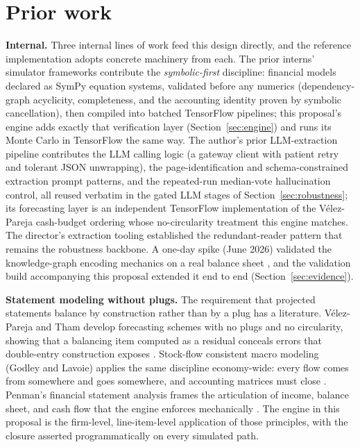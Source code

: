 \documentclass[11pt]{article}
\newcommand{\lead}[2]{\par\addvspace{5pt}\textbf{\textcolor{#1}{#2}}}
\begin{document}
\section{Prior work}
\label{sec:prior}
\lead{navytwo}{Internal.} Three internal lines of work feed this design directly, and the reference implementation adopts concrete machinery from each. The prior interns' simulator frameworks contribute the \emph{symbolic-first} discipline: financial models declared as SymPy equation systems, validated before any numerics (dependency-graph acyclicity, completeness, and the accounting identity proven by symbolic cancellation), then compiled into batched TensorFlow pipelines; this proposal's engine adds exactly that verification layer (Section~\ref{sec:engine}) and runs its Monte Carlo in TensorFlow the same way. The author's prior LLM-extraction pipeline contributes the LLM calling logic (a gateway client with patient retry and tolerant JSON unwrapping), the page-identification and schema-constrained extraction prompt patterns, and the repeated-run median-vote hallucination control, all reused verbatim in the gated LLM stages of Section~\ref{sec:robustness}; its forecasting layer is an independent TensorFlow implementation of the V\'elez-Pareja cash-budget ordering whose no-circularity treatment this engine matches. The director's extraction tooling established the redundant-reader pattern that remains the robustness backbone. A one-day spike (June 2026) validated the knowledge-graph encoding mechanics on a real balance sheet \cite{spike}, and the validation build accompanying this proposal extended it end to end (Section~\ref{sec:evidence}).

\lead{navytwo}{Statement modeling without plugs.} The requirement that projected statements balance by construction rather than by a plug has a literature. V\'elez-Pareja and Tham develop forecasting schemes with no plugs and no circularity, showing that a balancing item computed as a residual conceals errors that double-entry construction exposes \cite{velezpareja}. Stock-flow consistent macro modeling (Godley and Lavoie) applies the same discipline economy-wide: every flow comes from somewhere and goes somewhere, and accounting matrices must close \cite{godley}. Penman's financial statement analysis frames the articulation of income, balance sheet, and cash flow that the engine enforces mechanically \cite{penman}. The engine in this proposal is the firm-level, line-item-level application of those principles, with the closure asserted programmatically on every simulated path.
\end{document}
